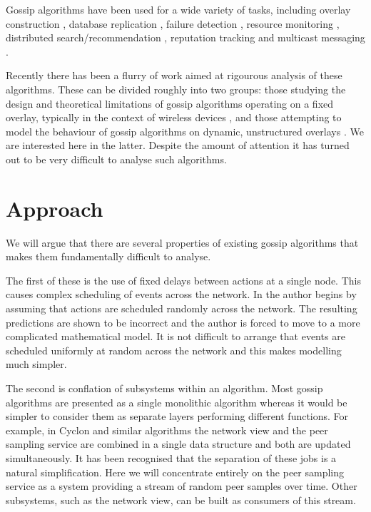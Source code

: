 \documentclass[a4paper,10pt]{article}
\begin{document}
Gossip algorithms have been used for a wide variety of tasks, including overlay construction \cite{cyclon}, database replication \cite{database_replication}, failure detection \cite{failure_detection}, resource monitoring \cite{astrolabe}, distributed search/recommendation \cite{tribler}, reputation tracking \cite{reputation} and multicast messaging \cite{multicast}. 

Recently there has been a flurry of work aimed at rigourous analysis of these algorithms. These can be divided roughly into two groups: those studying the design and theoretical limitations of gossip algorithms operating on a fixed overlay, typically in the context of wireless devices \cite{sensorish1, sensorish2}, and those attempting to model the behaviour of gossip algorithms on dynamic, unstructured overlays \cite{generic_theory, mean_field, gossip_prism, correctness, random_scheduling}. We are interested here in the latter. Despite the amount of attention it has turned out to be very difficult to analyse such algorithms. 

\section{Approach}

We will argue that there are several properties of existing gossip algorithms that makes them fundamentally difficult to analyse.

The first of these is the use of fixed delays between actions at a single node. This causes complex scheduling of events across the network. In \cite{random_scheduling} the author begins by assuming that actions are scheduled randomly across the network. The resulting predictions are shown to be incorrect and the author is forced to move to a more complicated mathematical model. It is not difficult to arrange that events are scheduled uniformly at random across the network and this makes modelling much simpler.

The second is conflation of subsystems within an algorithm. Most gossip algorithms are presented as a single monolithic algorithm whereas it would be simpler to consider them as separate layers performing different functions. For example, in Cyclon and similar algorithms the network view and the peer sampling service are combined in a single data structure and both are updated simultaneously. It has been recognised \cite{pss, generic_theory} that the separation of these jobs is a natural simplification. Here we will concentrate entirely on the peer sampling service as a system providing a stream of random peer samples over time. Other subsystems, such as the network view, can be built as consumers of this stream.
\end{document}
